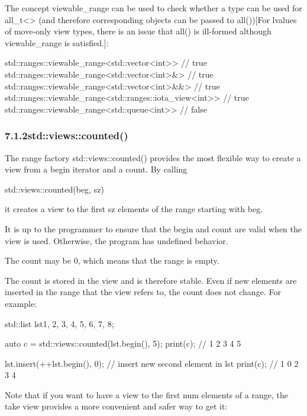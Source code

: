 The concept viewable\_range can be used to check whether a type can be used for all\_t<> (and therefore corresponding objects can be passed to all())[For lvalues of move-only view types, there is an issue that all() is ill-formed although viewable\_range is satisfied.]:

\begin{cpp}
std::ranges::viewable_range<std::vector<int>> // true
std::ranges::viewable_range<std::vector<int>&> // true
std::ranges::viewable_range<std::vector<int>&&> // true
std::ranges::viewable_range<std::ranges::iota_view<int>> // true
std::ranges::viewable_range<std::queue<int>> // false
\end{cpp}

\subsubsection*{ 7.1.2\hspace{0.2cm}std::views::counted()}

The range factory std::views::counted() provides the most flexible way to create a view from a begin iterator and a count. By calling

\begin{cpp}
std::views::counted(beg, sz)
\end{cpp}

it creates a view to the first sz elements of the range starting with beg.

It is up to the programmer to ensure that the begin and count are valid when the view is used. Otherwise, the program has undefined behavior.

The count may be 0, which means that the range is empty.

The count is stored in the view and is therefore stable. Even if new elements are inserted in the range that the view refers to, the count does not change. For example:

\begin{cpp}
std::list lst{1, 2, 3, 4, 5, 6, 7, 8};

auto c = std::views::counted(lst.begin(), 5);
print(c); // 1 2 3 4 5

lst.insert(++lst.begin(), 0); // insert new second element in lst
print(c); // 1 0 2 3 4
\end{cpp}

Note that if you want to have a view to the first num elements of a range, the take view provides a more convenient and safer way to get it:

